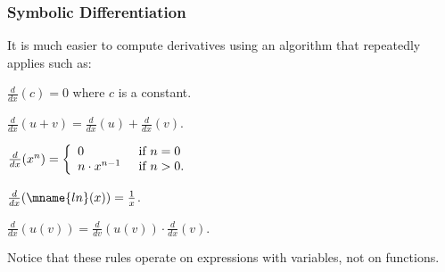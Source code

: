\documentclass[t,12pt,numbers,fleqn]{beamer}
\begin{document}
\begin{frame}
\frametitle{Symbolic Differentiation}
\bi

  \item It is much easier to compute derivatives using an algorithm
    that repeatedly applies 
    such as:

  \bi

    \item[] \vspace{1ex} $\frac{d}{dx}(c) = 0$ where $c$ is a constant.

    \item[] \vspace{1ex} $\frac{d}{dx}(u + v) = \frac{d}{dx}(u) + \frac{d}{dx}(v)$.

    \item[] \vspace{1ex} $\frac{d}{dx}(x^n) = 
    \left\{\begin{array}{ll}
              0 & \hspace{1ex} \mbox{if } n = 0\\
              n \cdot x^{n-1} & \hspace{1ex} \mbox{if } n > 0.  
           \end{array}
    \right.$

    \item[] \vspace{1ex} $\frac{d}{dx}(\mname{ln}(x)) = \frac{1}{x}$.

    \item[] \vspace{1ex} $\frac{d}{dx}(u(v)) = \frac{d}{dv}(u(v)) \cdot \frac{d}{dx}(v)$.

    \vspace{1ex} 

  \ei


  \item Notice that these rules operate on expressions with variables,
    not on functions.

\ei
\end{frame}   

\end{document}
